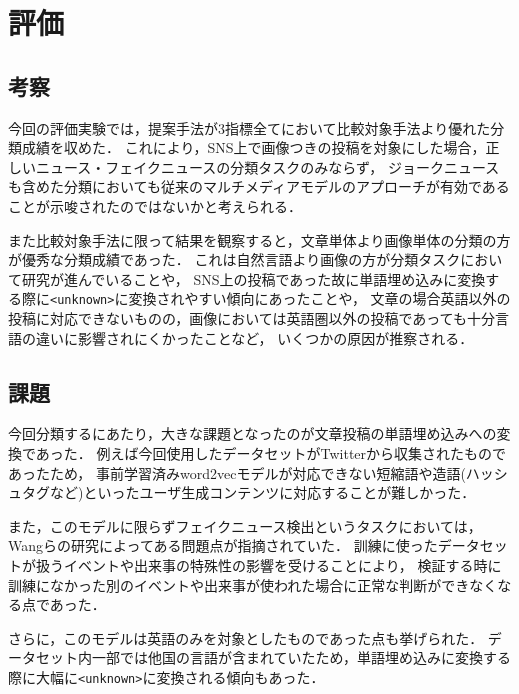 \chapter{評価}\label{ch:evaluate}

\section{考察}
今回の評価実験では，提案手法が3指標全てにおいて比較対象手法より優れた分類成績を収めた．
これにより，SNS上で画像つきの投稿を対象にした場合，正しいニュース・フェイクニュースの分類タスクのみならず，
ジョークニュースも含めた分類においても従来のマルチメディアモデルのアプローチが有効であることが示唆されたのではないかと考えられる．

また比較対象手法に限って結果を観察すると，文章単体より画像単体の分類の方が優秀な分類成績であった．
これは自然言語より画像の方が分類タスクにおいて研究が進んでいることや，
SNS上の投稿であった故に単語埋め込みに変換する際に\texttt{<unknown>}に変換されやすい傾向にあったことや，
文章の場合英語以外の投稿に対応できないものの，画像においては英語圏以外の投稿であっても十分言語の違いに影響されにくかったことなど，
いくつかの原因が推察される．

\section{課題}
今回分類するにあたり，大きな課題となったのが文章投稿の単語埋め込みへの変換であった．
例えば今回使用したデータセットがTwitterから収集されたものであったため，
事前学習済みword2vecモデルが対応できない短縮語や造語(ハッシュタグなど)といったユーザ生成コンテンツに対応することが難しかった．

また，このモデルに限らずフェイクニュース検出というタスクにおいては，Wangらの研究\cite{Wang:2018:EEA:3219819.3219903}によってある問題点が指摘されていた．
訓練に使ったデータセットが扱うイベントや出来事の特殊性の影響を受けることにより，
検証する時に訓練になかった別のイベントや出来事が使われた場合に正常な判断ができなくなる点であった．

さらに，このモデルは英語のみを対象としたものであった点も挙げられた．
データセット内一部では他国の言語が含まれていたため，単語埋め込みに変換する際に大幅に\texttt{<unknown>}に変換される傾向もあった．
%